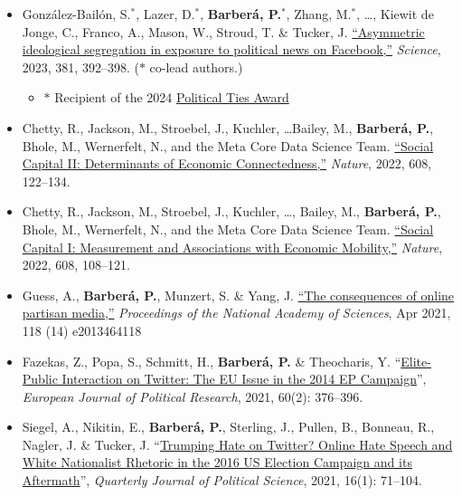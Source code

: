 \documentclass[margin,line,11pt]{resume}
\begin{document}
\begin{resume}
\begin{itemize}[leftmargin=5.5mm]
\item[26.] Gonz\'{a}lez-Bail\'{o}n, S.$^\ast$, Lazer, D.$^\ast$,  \textbf{Barber\'{a}, P.$^\ast$}, Zhang, M.$^\ast$, \ldots, Kiewit de Jonge, C., Franco, A., Mason, W., Stroud, T. \& Tucker, J. \href{https://www.science.org/doi/10.1126/science.ade7138}{``Asymmetric ideological segregation in exposure to political news on Facebook,''} \textit{Science}, 2023, 381, 392--398. ($\ast$ co-lead authors.)
\begin{itemize}
\item[] $\ast$ Recipient of the 2024 \href{https://apsanet.org/membership/organized-sections/organized-section-awards/past-awards/section-41/#political ties}{Political Ties Award}
\end{itemize}

\item[25.] Chetty, R., Jackson, M., Stroebel, J., Kuchler, \ldots Bailey, M., \textbf{Barber\'{a}, P.}, Bhole, M., Wernerfelt, N., and the Meta Core Data Science Team. \href{https://www.nature.com/articles/s41586-022-04997-3}{``Social Capital II: Determinants of Economic Connectedness,''} \textit{Nature}, 2022, 608, 122--134.

\item[24.] Chetty, R., Jackson, M., Stroebel, J., Kuchler, \ldots, Bailey, M., \textbf{Barber\'{a}, P.}, Bhole, M., Wernerfelt, N., and the Meta Core Data Science Team. \href{https://www.nature.com/articles/s41586-022-04996-4}{``Social Capital I: Measurement and Associations with Economic Mobility,''} \textit{Nature}, 2022, 608, 108--121. 

\item[23.] Guess, A., \textbf{Barber\'{a}, P.}, Munzert, S. \& Yang, J. \href{https://www.pnas.org/content/118/14/e2013464118}{``The consequences of online partisan media,''} \textit{Proceedings of the National Academy of Sciences}, Apr 2021, 118 (14) e2013464118

\item[22.] Fazekas, Z., Popa, S., Schmitt, H., \textbf{Barber\'{a}, P.} \& Theocharis, Y. ``\href{https://ejpr.onlinelibrary.wiley.com/doi/10.1111/1475-6765.12402}{Elite-Public Interaction on Twitter: The EU Issue in the 2014 EP Campaign}'', \textit{European Journal of Political Research}, 2021, 60(2): 376--396.

\item[21.] Siegel, A., Nikitin, E., \textbf{Barber\'{a}, P.}, Sterling, J., Pullen, B., Bonneau, R., Nagler, J. \& Tucker, J. ``\href{http://dx.doi.org/10.1561/100.00019045}{Trumping Hate on Twitter? Online Hate Speech and White Nationalist Rhetoric in the 2016 US Election Campaign and its Aftermath}'', \textit{Quarterly Journal of Political Science}, 2021, 16(1): 71--104.


\end{itemize}
\end{resume}
\end{document}
